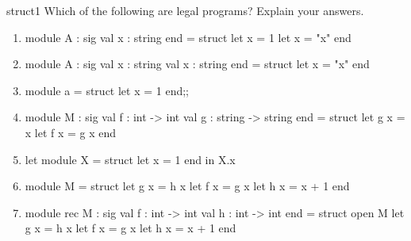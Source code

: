 %
%
%

%
\exercises

\begin{exercise}{struct1}
Which of the following are legal programs?  Explain your answers.
\begin{enumerate}
\item

\begin{ocamllisting}
module A : sig
   val x : string
end = struct
   let x = 1
   let x = "x"
end
\end{ocamllisting}

\item

\begin{ocamllisting}
module A : sig
   val x : string
   val x : string
end = struct
   let x = "x"
end
\end{ocamllisting}

\item

\begin{ocamllisting}
module a = struct
   let x = 1
end;;
\end{ocamllisting}

\item

\begin{ocamllisting}
module M : sig
   val f : int -> int
   val g : string -> string
end = struct
   let g x = x
   let f x = g x
end
\end{ocamllisting}

\item

\begin{ocamllisting}
let module X = struct let x = 1 end in X.x
\end{ocamllisting}

\item

\begin{ocamllisting}
module M = struct
   let g x = h x
   let f x = g x
   let h x = x + 1
end
\end{ocamllisting}

\item

\begin{ocamllisting}
module rec M : sig
   val f : int -> int
   val h : int -> int
end = struct
   open M
   let g x = h x
   let f x = g x
   let h x = x + 1
end
\end{ocamllisting}


\end{enumerate}
\end{exercise}
